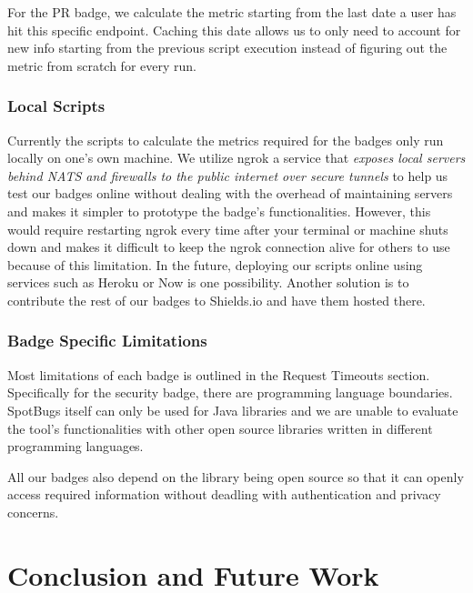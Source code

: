 \documentclass[12pt, letterpaper]{article}
\begin{document}
For the PR badge, we calculate the metric starting from the last date a user has hit this specific endpoint.
Caching this date allows us to only need to account for new info starting from the previous script execution
instead of figuring out the metric from scratch for every run.


\subsubsection{Local Scripts}
Currently the scripts to calculate the metrics required for the badges only run
locally on one's own machine. We utilize ngrok
\cite{ngrok} a service that \textit{exposes local servers behind NATS and firewalls to the public
internet over secure tunnels} to help us test our badges online without dealing with the overhead of maintaining
servers and makes it simpler to prototype the badge's functionalities. 
However, this would require restarting ngrok every time after your terminal or machine shuts down
and makes it difficult to keep the ngrok connection alive for others to use because of this limitation.
In the future, deploying our scripts online using services such as Heroku \cite{heroku} or Now \cite{nowjs}
is one possibility. Another solution is to contribute the rest of our badges to Shields.io \cite{shieldsrepo}
and have them hosted there.

\subsubsection{Badge Specific Limitations}
Most limitations of each badge is outlined in the Request Timeouts section.
Specifically for the security badge, there are programming language boundaries.
SpotBugs \cite{spotbugs} itself can only be used for Java libraries and we are 
unable to evaluate the tool's functionalities with other open source libraries written
in different programming languages.


All our badges also depend on the library being open source so that it can openly
access required information without deadling with authentication and privacy concerns.

\section{Conclusion and Future Work}


\newpage


\end{document}
